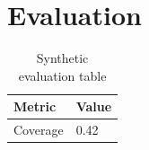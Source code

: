 \chapter{Evaluation}

\begin{table}[h]
\centering
\begin{tabular}{ll}
Metric & Value \\
\hline
Coverage & 0.42 \\
\end{tabular}
\caption{Synthetic evaluation table}
\end{table}

\label{fig:dup}
\label{bad label}

